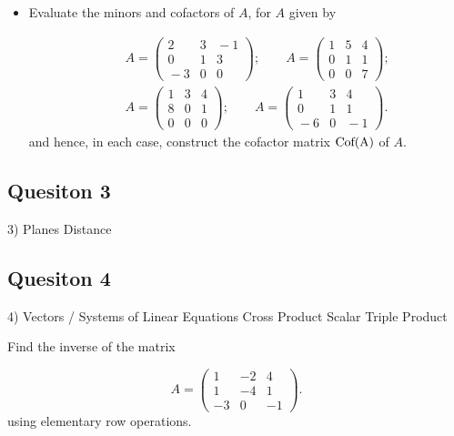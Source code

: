 \begin{itemize}	
\item Evaluate the  minors and cofactors of $A$, for $A$ given by

\begin{eqnarray*}
& &\!\!\!\!\!\!\!\!A=\left( \begin{array}{ccc}
2 & 3 & \!\!\!\!-1\\
0 & 1 & 3\\
\!\!\!\!-3 & 0 & 0\end{array}\right);\qquad A=\left( \begin{array}{ccc}
1 & 5 & 4\\
0 & 1 & 1\\
0 & 0 & 7
\end{array} \right);\\
& &\!\!\!\!\!\!\!\!A=\left( \begin{array}{ccc}
1 & 3 & 4\\
8 & 0 & 1\\
0 & 0 & 0\end{array}\right);\qquad A=\left( \begin{array}{ccc}
1 & 3 & 4\\
0 & 1 & 1\\
\!\!\!\!-6 & 0 & \!\!\!\!-1
\end{array} \right).
\end{eqnarray*}
and hence, in each case, construct the cofactor matrix $\textnormal{Cof(A)}$ of $A$.
\end{itemize}

\subsection*{Quesiton 3}

3) Planes
	Distance
\subsection*{Quesiton 4}
4) Vectors / Systems of Linear Equations
	Cross Product
	Scalar Triple Product


 Find the inverse of the  matrix 

\begin{equation*}
A=\left( \begin{array}{rrr}
1 & -2 & 4\\
1 & -4 & 1\\
-3 & 0 & -1
\end{array} \right).
\end{equation*}
using elementary row operations.

